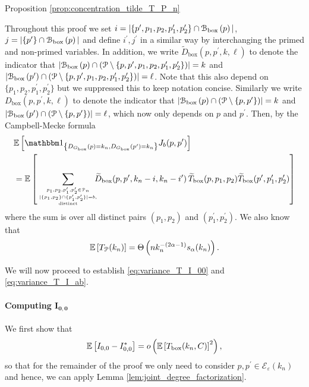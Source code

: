 \begin{proofof}{Proposition \ref{prop:concentration_tilde_T_P_n}}

Throughout this proof we set $i = |\{p^\prime, p_1, p_2, p_1^\prime, p_2^\prime\} \cap {\mathcal B}_{\text{box}}\left(p\right)|$, $j = |\{p^\prime\} \cap {\mathcal B}_{\text{box}}\left(p\right)|$ and define $i^\prime, j^\prime$ in a similar way by interchanging the primed and non-primed variables. In addition, we write $\widetilde{D}_{\text{box}}(p,p^\prime,k,\ell)$ to denote the indicator that $|{\mathcal B}_{\text{box}}\left(p\right) \cap ({\mathcal P} \setminus \{p, p^\prime, p_1, p_2, p_1^\prime, p_2^\prime\})| = k$ and $|{\mathcal B}_{\text{box}}\left(p^\prime\right) \cap ({\mathcal P} \setminus \{p, p^\prime, p_1, p_2, p_1^\prime, p_2^\prime\})| = \ell$. Note that this also depend on $\{p_1, p_2, p_1^\prime, p_2^\prime\}$ but we suppressed this to keep notation concise. Similarly we write $D_{\text{box}}(p,p^\prime,k,\ell)$ to denote the indicator that $|{\mathcal B}_{\text{box}}\left(p\right) \cap ({\mathcal P} \setminus \{p, p^\prime\})| = k$ and $|{\mathcal B}_{\text{box}}\left(p^\prime\right) \cap ({\mathcal P} \setminus \{p, p^\prime\})| = \ell$, which now only depends on $p$ and $p^\prime$. Then, by the Campbell-Mecke formula
\begin{align*}
	&\Exp{\ind{\Dbox(p) = k_n, \Dbox(p^\prime) = k_n} J_b(p,p^\prime)}\\
	&= \Exp{\sum_{{p_1, p_2, p_1^\prime, p_2^\prime \in \Pcal_n 
		\atop |\{p_1, p_2\} \cap \{p_1^\prime, p_2^\prime\}| = b,} \atop \text{distinct}}
			\hspace{-7pt} \widetilde{D}_{\text{box}}(p,p^\prime, k_n-i,k_n- i^\prime) \,
			\widetilde{T}_{\text{box}}(p,p_1,p_2) \widetilde{T}_{\text{box}}(p^\prime, p_1^\prime, p_2^\prime)}
\end{align*}
where the sum is over all distinct pairs $(p_1, p_2)$ and $(p_1^\prime, p_2^\prime)$. We also know that 
\[
	\mathbb{E}\left[T_{{\mathcal P}}(k_n)\right] = \Theta\left(n k_n^{-(2\alpha - 1)} s_\alpha(k_n)\right).
\]

We will now proceed to establish \eqref{eq:variance_T_I_00} and \eqref{eq:variance_T_I_ab}. 

\paragraph{Computing $\bm{I_{0,0}}$}
We first show that
\begin{equation}\label{eq:I_ab_ast_main}
	\mathbb{E}\left[I_{0,0} - I_{0,0}^\ast\right] = o\left(\mathbb{E}\left[T_{\text{box}}(k_n,C)\right]^2\right),
\end{equation}
so that for the remainder of the proof we only need to consider $p, p^\prime \in \mathcal{E}_\varepsilon(k_n)$ and hence, we can apply Lemma \ref{lem:joint_degree_factorization}. 


\end{proofof}
